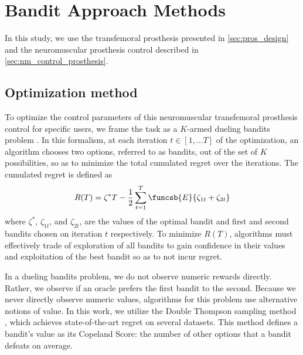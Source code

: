 \section{Bandit Approach Methods}\label{sec:bandit_methods}

In this study, we use the transfemoral prosthesis presented in
\cref{sec:pros_design} and the neuromuscular prosthesis control described in
\cref{sec:nm_control_prosthesis}. 

\subsection{Optimization method}\label{sec:bandit_optimization}

To optimize the control parameters of this neuromuscular transfemoral prosthesis
control for specific users, we frame the task as a $K$-armed dueling bandits
problem \citep{yue2012k}. In this formalism, at each iteration $t \in [1,\ldots
T]$ of the optimization, an algorithm chooses two options, referred to as
bandits, out of the set of $K$ possibilities, so as to minimize the total
cumulated regret over the iterations. The cumulated regret is defined as
\begin{align}
    R(T) = \zeta^* T - \frac{1}{2} \sum_{t=1}^T \funcsb{E}{\zeta_{1t} + \zeta_{2t}}
\end{align}
where $\zeta^*$, $\zeta_{1t}$, and $\zeta_{2t}$, are the values of the optimal
bandit and first and second bandits chosen on iteration $t$ respectively. To
minimize $R(T)$, algorithms must effectively trade of exploration of all bandits
to gain confidence in their values and exploitation of the best bandit so as to
not incur regret.

In a dueling bandits problem, we do not observe numeric rewards directly.
Rather, we observe if an oracle prefers the first bandit to the second.  Because
we never directly observe numeric values, algorithms for this problem use
alternative notions of value. In this work, we utilize the Double Thompson
sampling method \citep{wu2016double}, which achieves state-of-the-art regret on
several datasets. This method defines a bandit's value as its Copeland Score:
the number of other options that a bandit defeats on average.

